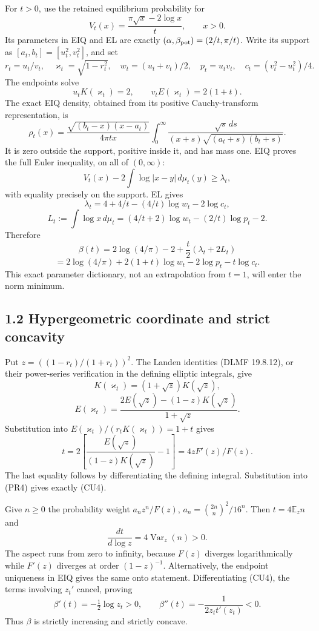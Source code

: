 \documentclass[10pt]{article}
\begin{document}
For \(t>0\), use the retained equilibrium probability for \[
 V_t(x)=\frac{\pi\sqrt x-2\log x}{t},\qquad x>0.
\] Its parameters in EIQ and EL are exactly \((\alpha,\beta_{\rm pot})=(2/t,\pi/t)\). Write its support as \([a_t,b_t]=[u_t^2,v_t^2]\), and set \[
 r_t=u_t/v_t,\quad \varkappa_t=\sqrt{1-r_t^2},\quad
 w_t=(u_t+v_t)/2,\quad p_t=u_tv_t,\quad c_t=(v_t^2-u_t^2)/4.
\] The endpoints solve \[
 u_tK(\varkappa_t)=2,\qquad
 v_tE(\varkappa_t)=2(1+t).
 \tag{PR1}
\] The exact EIQ density, obtained from its positive Cauchy-transform representation, is \[
 \rho_t(x)=\frac{\sqrt{(b_t-x)(x-a_t)}}{4\pi t x}
 \int_0^\infty
 \frac{\sqrt s\,ds}{(x+s)\sqrt{(a_t+s)(b_t+s)}}.
 \tag{PR2}
\] It is zero outside the support, positive inside it, and has mass one. EIQ proves the full Euler inequality, on all of \((0,\infty)\): \[
 V_t(x)-2\int\log|x-y|\,d\mu_t(y)\ge\lambda_t,
\] with equality precisely on the support. EL gives \[
 \lambda_t=4+4/t-(4/t)\log w_t-2\log c_t,
\] \[
 L_t:=\int\log x\,d\mu_t
 =(4/t+2)\log w_t-(2/t)\log p_t-2.
 \tag{PR3}
\] Therefore \[
 \boxed{\beta(t)=2\log(4/\pi)-2+\frac t2(\lambda_t+2L_t)}
\] \[
 =2\log(4/\pi)+2(1+t)\log w_t-2\log p_t-t\log c_t.
 \tag{PR4}
\] This exact parameter dictionary, not an extrapolation from \(t=1\), will enter the norm minimum.

\subsection{1.2 Hypergeometric coordinate and strict concavity}\label{hypergeometric-coordinate-and-strict-concavity}

Put \(z=((1-r_t)/(1+r_t))^2\). The Landen identities (DLMF 19.8.12), or their power-series verification in the defining elliptic integrals, give \[
 K(\varkappa_t)=(1+\sqrt z)K(\sqrt z),
\] \[
 E(\varkappa_t)=\frac{2E(\sqrt z)-(1-z)K(\sqrt z)}{1+\sqrt z}.
\] Substitution into \(E(\varkappa_t)/(r_tK(\varkappa_t))=1+t\) gives \[
 t=2\left[\frac{E(\sqrt z)}{(1-z)K(\sqrt z)}-1\right]
 =4zF'(z)/F(z).
 \tag{PR5}
\] The last equality follows by differentiating the defining integral. Substitution into (PR4) gives exactly (CU4).

Give \(n\ge0\) the probability weight \(a_nz^n/F(z)\), \(a_n=\binom{2n}{n}^2/16^n\). Then \(t=4\mathbb E_z n\) and \[
 \frac{dt}{d\log z}=4\operatorname{Var}_z(n)>0.
\] The aspect runs from zero to infinity, because \(F(z)\) diverges logarithmically while \(F'(z)\) diverges at order \((1-z)^{-1}\). Alternatively, the endpoint uniqueness in EIQ gives the same onto statement. Differentiating (CU4), the terms involving \(z_t'\) cancel, proving \[
 \boxed{\beta'(t)=-\tfrac12\log z_t>0,\qquad
 \beta''(t)=-\frac1{2z_t t'(z_t)}<0.}
 \tag{PR6}
\] Thus \(\beta\) is strictly increasing and strictly concave.
\end{document}
